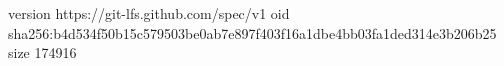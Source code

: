 version https://git-lfs.github.com/spec/v1
oid sha256:b4d534f50b15c579503be0ab7e897f403f16a1dbe4bb03fa1ded314e3b206b25
size 174916
